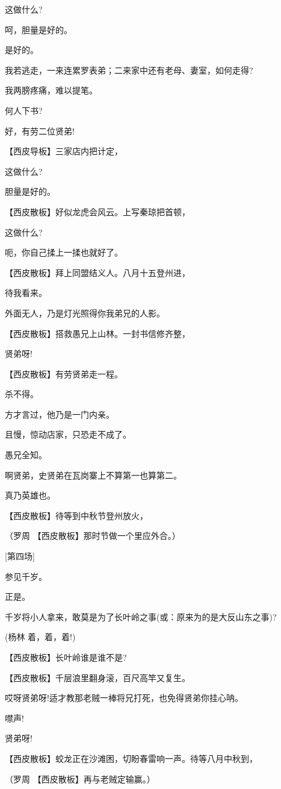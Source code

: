 这做什么?

呵，胆量是好的。

是好的。

我若逃走，一来连累罗表弟；二来家中还有老母、妻室，如何走得?

我两膀疼痛，难以提笔。

何人下书?

好，有劳二位贤弟!

【西皮导板】三家店内把计定，

这做什么?

胆量是好的。

【西皮散板】好似龙虎会风云。上写秦琼把首顿，

这做什么?

呃，你自己揉上一揉也就好了。

【西皮散板】拜上同盟结义人。八月十五登州进，

待我看来。

外面无人，乃是灯光照得你我弟兄的人影。

【西皮散板】搭救愚兄上山林。一封书信修齐整，

贤弟呀!

【西皮散板】有劳贤弟走一程。

杀不得。

方才言过，他乃是一门内亲。

且慢，惊动店家，只恐走不成了。

愚兄全知。

啊贤弟，史贤弟在瓦岗寨上不算第一也算第二。

真乃英雄也。

【西皮散板】待等到中秋节登州放火，

（罗周 【西皮散板】那时节做一个里应外合。）

{[}第四场{]}

参见千岁。

正是。

千岁将小人拿来，敢莫是为了长叶岭之事(或：原来为的是大反山东之事)?

(杨林 着，着，着!)

【西皮散板】长叶岭谁是谁不是?

【西皮散板】千层浪里翻身滚，百尺高竿又复生。

哎呀贤弟呀!适才教那老贼一棒将兄打死，也免得贤弟你挂心呐。

噤声!

贤弟呀!

【西皮散板】蛟龙正在沙滩困，切盼春雷响一声。待等八月中秋到，

（罗周 【西皮散板】再与老贼定输赢。）

